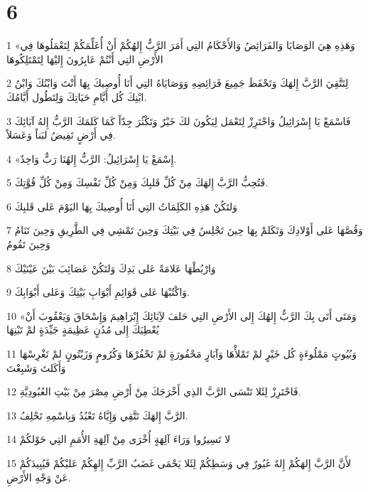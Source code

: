 \chapter{6}

\par 1 «وَهَذِهِ هِيَ الوَصَايَا وَالفَرَائِضُ وَالأَحْكَامُ التِي أَمَرَ الرَّبُّ إِلهُكُمْ أَنْ أُعَلِّمَكُمْ لِتَعْمَلُوهَا فِي الأَرْضِ التِي أَنْتُمْ عَابِرُونَ إِليْهَا لِتَمْتَلِكُوهَا
\par 2 لِتَتَّقِيَ الرَّبَّ إِلهَكَ وَتَحْفَظَ جَمِيعَ فَرَائِضِهِ وَوَصَايَاهُ التِي أَنَا أُوصِيكَ بِهَا أَنْتَ وَابْنُكَ وَابْنُ ابْنِكَ كُل أَيَّامِ حَيَاتِكَ وَلِتَطُول أَيَّامُكَ.
\par 3 فَاسْمَعْ يَا إِسْرَائِيلُ وَاحْتَرِزْ لِتَعْمَل لِيَكُونَ لكَ خَيْرٌ وَتَكْثُرَ جِدّاً كَمَا كَلمَكَ الرَّبُّ إِلهُ آبَائِكَ فِي أَرْضٍ تَفِيضُ لبَناً وَعَسَلاً.
\par 4 «إِسْمَعْ يَا إِسْرَائِيلُ: الرَّبُّ إِلهُنَا رَبٌّ وَاحِدٌ.
\par 5 فَتُحِبُّ الرَّبَّ إِلهَكَ مِنْ كُلِّ قَلبِكَ وَمِنْ كُلِّ نَفْسِكَ وَمِنْ كُلِّ قُوَّتِكَ.
\par 6 وَلتَكُنْ هَذِهِ الكَلِمَاتُ التِي أَنَا أُوصِيكَ بِهَا اليَوْمَ عَلى قَلبِكَ
\par 7 وَقُصَّهَا عَلى أَوْلادِكَ وَتَكَلمْ بِهَا حِينَ تَجْلِسُ فِي بَيْتِكَ وَحِينَ تَمْشِي فِي الطَّرِيقِ وَحِينَ تَنَامُ وَحِينَ تَقُومُ
\par 8 وَارْبُطْهَا عَلامَةً عَلى يَدِكَ وَلتَكُنْ عَصَائِبَ بَيْنَ عَيْنَيْكَ
\par 9 وَاكْتُبْهَا عَلى قَوَائِمِ أَبْوَابِ بَيْتِكَ وَعَلى أَبْوَابِكَ.
\par 10 «وَمَتَى أَتَى بِكَ الرَّبُّ إِلهُكَ إِلى الأَرْضِ التِي حَلفَ لآِبَائِكَ إِبْرَاهِيمَ وَإِسْحَاقَ وَيَعْقُوبَ أَنْ يُعْطِيَكَ إِلى مُدُنٍ عَظِيمَةٍ جَيِّدَةٍ لمْ تَبْنِهَا
\par 11 وَبُيُوتٍ مَمْلُوءَةٍ كُل خَيْرٍ لمْ تَمْلأْهَا وَآبَارٍ مَحْفُورَةٍ لمْ تَحْفُرْهَا وَكُرُومٍ وَزَيْتُونٍ لمْ تَغْرِسْهَا وَأَكَلتَ وَشَبِعْتَ
\par 12 فَاحْتَرِزْ لِئَلا تَنْسَى الرَّبَّ الذِي أَخْرَجَكَ مِنْ أَرْضِ مِصْرَ مِنْ بَيْتِ العُبُودِيَّةِ.
\par 13 الرَّبَّ إِلهَكَ تَتَّقِي وَإِيَّاهُ تَعْبُدُ وَبِاسْمِهِ تَحْلِفُ.
\par 14 لا تَسِيرُوا وَرَاءَ آلِهَةٍ أُخْرَى مِنْ آلِهَةِ الأُمَمِ التِي حَوْلكُمْ
\par 15 لأَنَّ الرَّبَّ إِلهَكُمْ إِلهٌ غَيُورٌ فِي وَسَطِكُمْ لِئَلا يَحْمَى غَضَبُ الرَّبِّ إِلهِكُمْ عَليْكُمْ فَيُبِيدَكُمْ عَنْ وَجْهِ الأَرْضِ.
